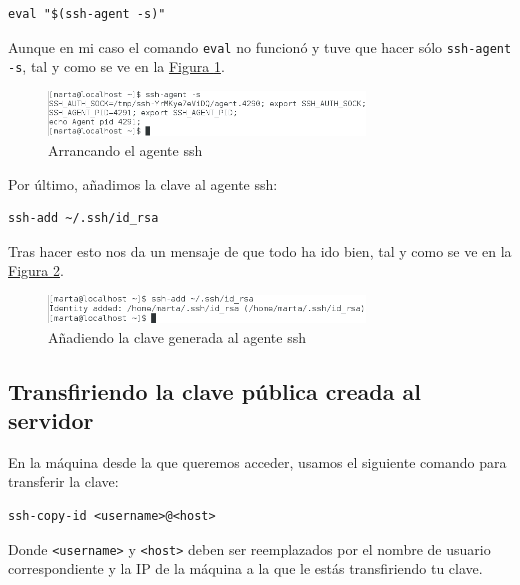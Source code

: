\documentclass[10pt,a4paper,spanish]{article}
\numberwithin{equation}{section} %
\numberwithin{figure}{section} %
\numberwithin{table}{section} %
\begin{document}
\begin{verbatim}
eval "$(ssh-agent -s)"
\end{verbatim}

Aunque en mi caso el comando \texttt{eval} no funcionó y tuve que hacer sólo \texttt{ssh-agent -s}, tal y como se ve en la \hyperref[sshagent]{Figura \ref*{sshagent}}.

\begin{figure}[!h]
\centering
\includegraphics[width=0.75\textwidth]{6}
\caption{Arrancando el agente ssh}
\label{sshagent}
\end{figure}

Por último, añadimos la clave al agente ssh:

\begin{verbatim}
ssh-add ~/.ssh/id_rsa
\end{verbatim}

Tras hacer esto nos da un mensaje de que todo ha ido bien, tal y como se ve en la \hyperref[claveadd]{Figura \ref*{claveadd}}.

\begin{figure}[!h]
    \centering
    \includegraphics[width=0.75\textwidth]{7}
    \caption{Añadiendo la clave generada al agente ssh}
    \label{claveadd}
\end{figure}

\subsection{Transfiriendo la clave pública creada al servidor}
En la máquina desde la que queremos acceder, usamos el siguiente comando para transferir la clave:

\begin{verbatim}
ssh-copy-id <username>@<host>
\end{verbatim}

Donde \texttt{<username>} y \texttt{<host>} deben ser reemplazados por el nombre de usuario correspondiente y la IP de la máquina a la que le estás transfiriendo tu clave.
\end{document}

